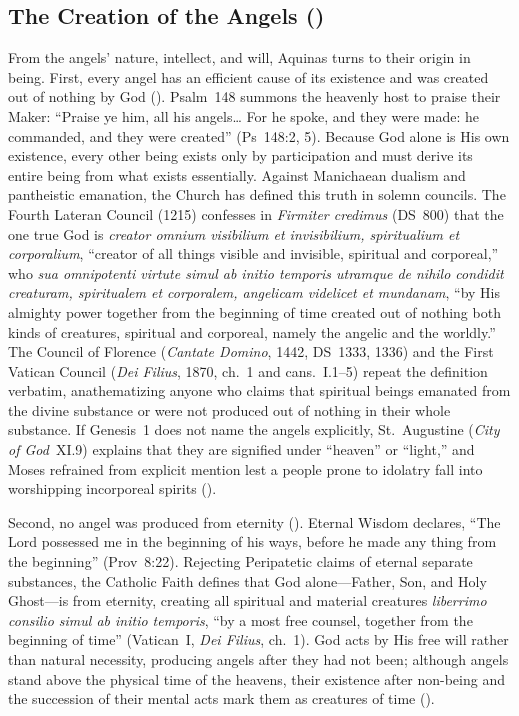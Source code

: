 \subsection{The Creation of the Angels ()}

From the angels' nature, intellect, and will, Aquinas turns to their origin in being. First, every angel has an efficient cause of its existence and was created out of nothing by God (). Psalm~148 summons the heavenly host to praise their Maker: ``Praise ye him, all his angels\dots{} For he spoke, and they were made: he commanded, and they were created'' (Ps~148:2, 5). Because God alone is His own existence, every other being exists only by participation and must derive its entire being from what exists essentially. Against Manichaean dualism and pantheistic emanation, the Church has defined this truth in solemn councils. The Fourth Lateran Council (1215) confesses in \emph{Firmiter credimus} (DS~800) that the one true God is \emph{creator omnium visibilium et invisibilium, spiritualium et corporalium}, ``creator of all things visible and invisible, spiritual and corporeal,'' who \emph{sua omnipotenti virtute simul ab initio temporis utramque de nihilo condidit creaturam, spiritualem et corporalem, angelicam videlicet et mundanam}, ``by His almighty power together from the beginning of time created out of nothing both kinds of creatures, spiritual and corporeal, namely the angelic and the worldly.'' The Council of Florence (\emph{Cantate Domino}, 1442, DS~1333, 1336) and the First Vatican Council (\emph{Dei Filius}, 1870, ch.~1 and cans.~I.1--5) repeat the definition verbatim, anathematizing anyone who claims that spiritual beings emanated from the divine substance or were not produced out of nothing in their whole substance. If Genesis~1 does not name the angels explicitly, St.~Augustine (\emph{City of God}~XI.9) explains that they are signified under ``heaven'' or ``light,'' and Moses refrained from explicit mention lest a people prone to idolatry fall into worshipping incorporeal spirits ().

Second, no angel was produced from eternity (). Eternal Wisdom declares, ``The Lord possessed me in the beginning of his ways, before he made any thing from the beginning'' (Prov~8:22). Rejecting Peripatetic claims of eternal separate substances, the Catholic Faith defines that God alone---Father, Son, and Holy Ghost---is from eternity, creating all spiritual and material creatures \emph{liberrimo consilio simul ab initio temporis}, ``by a most free counsel, together from the beginning of time'' (Vatican~I, \emph{Dei Filius}, ch.~1). God acts by His free will rather than natural necessity, producing angels after they had not been; although angels stand above the physical time of the heavens, their existence after non-being and the succession of their mental acts mark them as creatures of time ().

